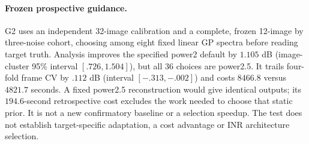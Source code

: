 \paragraph{Frozen prospective guidance.} G2 uses an independent 32-image calibration and a complete, frozen 12-image by three-noise cohort, choosing among eight fixed linear GP spectra before reading target truth. Analysis improves the specified power2 default by $1.105$ dB (image-cluster 95\% interval $[.726,1.504]$), but all 36 choices are power2.5. It trails four-fold frame CV by $.112$ dB (interval $[-.313,-.002]$) and costs $8466.8$ versus $4821.7$ seconds. A fixed power2.5 reconstruction would give identical outputs; its $194.6$-second retrospective cost excludes the work needed to choose that static prior. It is not a new confirmatory baseline or a selection speedup. The test does not establish target-specific adaptation, a cost advantage or INR architecture selection.

